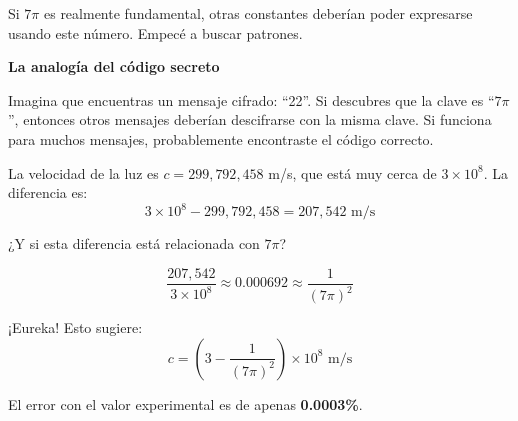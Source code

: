 \documentclass[12pt,a4paper,openany]{book}
\begin{document}
\begin{nivelnarrativo}
Si $7\pi$ es realmente fundamental, otras constantes deberían poder expresarse usando este número. Empecé a buscar patrones.

\begin{analogiabox}
\textbf{La analogía del código secreto}

Imagina que encuentras un mensaje cifrado: ``22''. Si descubres que la clave es ``$7\pi$'', entonces otros mensajes deberían descifrarse con la misma clave. Si funciona para muchos mensajes, probablemente encontraste el código correcto.
\end{analogiabox}

La velocidad de la luz es $c = 299,792,458$ m/s, que está muy cerca de $3 \times 10^8$. La diferencia es:
\[
3 \times 10^8 - 299,792,458 = 207,542 \text{ m/s}
\]

¿Y si esta diferencia está relacionada con $7\pi$?

\[
\frac{207,542}{3 \times 10^8} \approx 0.000692 \approx \frac{1}{(7\pi)^2}
\]

¡Eureka! Esto sugiere:
\[
c = \left(3 - \frac{1}{(7\pi)^2}\right) \times 10^8 \text{ m/s}
\]

El error con el valor experimental es de apenas \textbf{0.0003\%}.

\end{nivelnarrativo}
\end{document}
